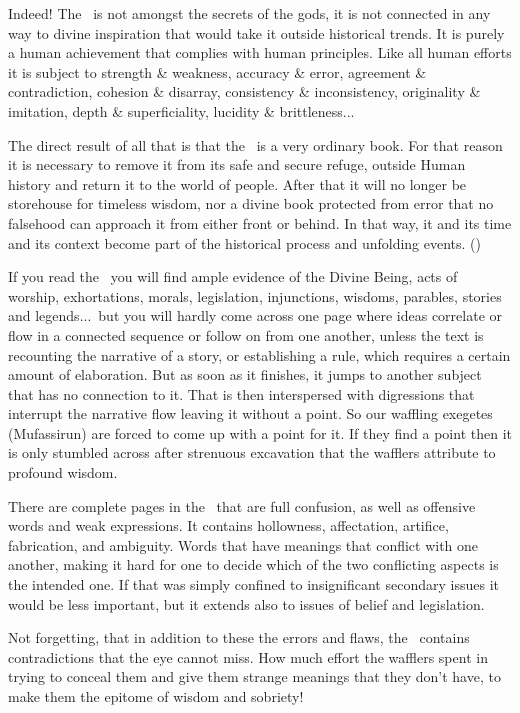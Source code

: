 \documentclass[12pt]{memoir}
\begin{document}
Indeed! The \Quran\ is not amongst the secrets of the gods,
it is not connected in any way to divine inspiration
that would take it outside historical trends.
It is purely a human achievement that complies with human principles.
Like all human efforts it is subject to strength \& weakness,
accuracy \& error, agreement \& contradiction, cohesion \& disarray,
consistency \& inconsistency, originality \& imitation,
depth \& superficiality, lucidity \& brittleness...

The direct result of all that is that the \Quran\ is a very ordinary book.
For that reason it is necessary to remove it from its safe and secure refuge,
outside Human history and return it to the world of people.
After that it will no longer be storehouse for timeless wisdom,
nor a divine book protected from error that no falsehood
can approach it from either front or behind.
In that way, it and its time and its context become
part of the historical process and unfolding events.
()

If you read the \Quran\ you will find ample evidence of the Divine Being,
acts of worship, exhortations, morals, legislation, injunctions, wisdoms,
parables, stories and legends...\ but you will hardly come across one page
where ideas correlate or flow in a connected sequence
or follow on from one another,
unless the text is recounting the narrative of a story,
or establishing a rule, which requires a certain amount of elaboration.
But as soon as it finishes, it jumps to another subject
that has no connection to it.
That is then interspersed with digressions that
interrupt the narrative flow leaving it without a point.
So our waffling exegetes (Mufassirun) are forced
to come up with a point for it.
If they find a point then it is only stumbled across after
strenuous excavation that the wafflers attribute to profound wisdom.

There are complete pages in the \Quran\ that are full confusion,
as well as offensive words and weak expressions.
It contains hollowness, affectation, artifice, fabrication, and ambiguity.
Words that have meanings that conflict with one another,
making it hard for one to decide
which of the two conflicting aspects is the intended one.
If that was simply confined to insignificant secondary issues
it would be less important,
but it extends also to issues of belief and legislation.

Not forgetting, that in addition to these the errors and flaws,
the \Quran\ contains contradictions that the eye cannot miss.
How much effort the wafflers spent in trying to conceal them
and give them strange meanings that they don’t have,
to make them the epitome of wisdom and sobriety!
\end{document}
